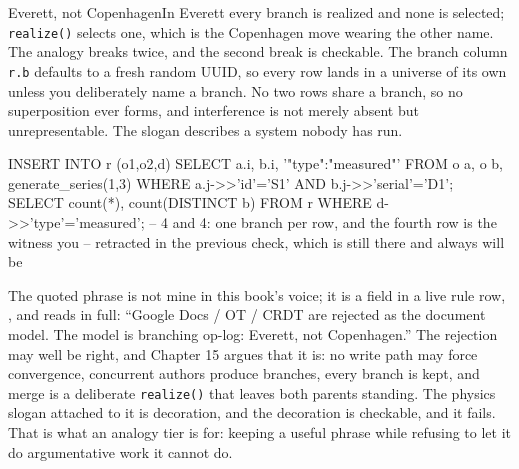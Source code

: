\begin{Analogy}{Everett, not Copenhagen}{In Everett every branch is realized and none is selected; \texttt{realize()} selects one, which is the Copenhagen move wearing the other name.}
The analogy breaks twice, and the second break is checkable. The branch column \texttt{r.b} defaults to a fresh random UUID, so every row lands in a universe of its own unless you deliberately name a branch. No two rows share a branch, so no superposition ever forms, and interference is not merely absent but unrepresentable. The slogan describes a system nobody has run.
\begin{Check}
INSERT INTO r (o1,o2,d)
  SELECT a.i, b.i, '{"type":"measured"}' FROM o a, o b, generate_series(1,3)
  WHERE a.j->>'id'='S1' AND b.j->>'serial'='D1';
SELECT count(*), count(DISTINCT b) FROM r WHERE d->>'type'='measured';
--   4 and 4: one branch per row, and the fourth row is the witness you
--   retracted in the previous check, which is still there and always will be
\end{Check}
The quoted phrase is not mine in this book's voice; it is a field in a live rule row, , and reads in full: ``Google Docs / OT / CRDT are rejected as the document model. The model is branching op-log: Everett, not Copenhagen.'' The rejection may well be right, and Chapter 15 argues that it is: no write path may force convergence, concurrent authors produce branches, every branch is kept, and merge is a deliberate \texttt{realize()} that leaves both parents standing. The physics slogan attached to it is decoration, and the decoration is checkable, and it fails. That is what an analogy tier is for: keeping a useful phrase while refusing to let it do argumentative work it cannot do.
\end{Analogy}


